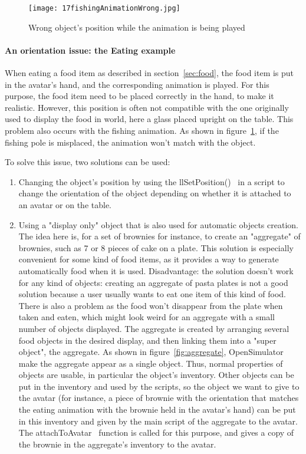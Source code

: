 \begin{itemize}
\begin{itemize}
{\begin{figure}[h]
  \caption{Wrong object's position while the animation is being played}
  \centering
  \texttt{[image: 17fishingAnimationWrong.jpg]}
  \label{fig:17fishingAnimationWrong}
\end{figure}

\paragraph{An orientation issue: the Eating example}
When eating a food item as described in section~\ref{sec:food}, the food item is put in the avatar's hand, and the corresponding animation is played. For this purpose, the food item need to be placed correctly in the hand, to make it realistic. However, 
this position is often not compatible with the one originally used to display the food in world, here a glass placed upright on the table. This problem also occurs with the fishing animation. As shown in figure~\ref{fig:17fishingAnimationWrong}, if the fishing pole is misplaced, the animation won't match with the object.

To solve this issue, two solutions can be used: 
\begin{enumerate}
\item Changing the object's position by using the llSetPosition()~\cite{llSetPositionWebsite} in a script to change the orientation of the object depending on whether it is attached to an avatar or on the table. 
\item Using a "display only" object that is also used for automatic objects creation. The idea here is, for a set of brownies for instance, to create an "aggregate" of brownies, such as 7 or 8 pieces of cake on a plate.
This solution is especially convenient for some kind of food items, as it provides a way to generate automatically food when it is used. Disadvantage: the solution doesn't work for any kind of objects: creating an aggregate of pasta plates is not a good solution because a user usually wants to eat one item of this kind of food. There is also a problem as the food won't disappear from the plate when taken and eaten, which might look weird for an aggregate with a small number of objects displayed.  
The aggregate is created by arranging several food objects in the desired display, and then linking them into a "super object", the aggregate. As shown in figure~\ref{fig:aggregate}, OpenSimulator make the aggregate appear as a single object. Thus, normal properties of objects are usable, in particular the object's inventory. Other objects can be put in the inventory and used by the scripts, so the object we want to give to the avatar (for instance, a piece of brownie with the orientation that matches the eating animation with the brownie held in the avatar's hand) can be put in this inventory and given by the main script of the aggregate to the avatar. The attachToAvatar~\cite{llAttachToAvatarWebsite} function is called for this purpose, and gives a copy of the brownie in the aggregate's inventory to the avatar. 
\end{enumerate}

}
\end{itemize}
\end{itemize}
